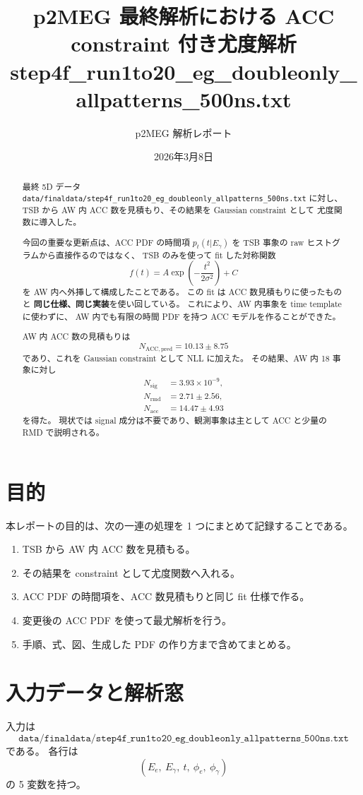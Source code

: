\documentclass[a4paper,11pt]{jsarticle}
\title{p2MEG 最終解析における ACC constraint 付き尤度解析\\
step4f\_run1to20\_eg\_doubleonly\_allpatterns\_500ns.txt}
\author{p2MEG 解析レポート}
\date{2026年3月8日}
\begin{document}
\maketitle

\begin{abstract}
最終 5D データ
\texttt{data/finaldata/step4f\_run1to20\_eg\_doubleonly\_allpatterns\_500ns.txt}
に対し、TSB から AW 内 ACC 数を見積もり、その結果を Gaussian constraint として
尤度関数に導入した。

今回の重要な更新点は、ACC PDF の時間項 \(p_t(t|E_\gamma)\) を
TSB 事象の raw ヒストグラムから直接作るのではなく、
TSB のみを使って fit した対称関数
\[
f(t)=A\exp\left(-\frac{t^2}{2\sigma^2}\right)+C
\]
を AW 内へ外挿して構成したことである。
この fit は ACC 数見積もりに使ったものと
\textbf{同じ仕様、同じ実装}を使い回している。
これにより、AW 内事象を time template に使わずに、
AW 内でも有限の時間 PDF を持つ ACC モデルを作ることができた。

AW 内 ACC 数の見積もりは
\[
N_{\mathrm{ACC,pred}} = 10.13 \pm 8.75
\]
であり、これを Gaussian constraint として NLL に加えた。
その結果、AW 内 18 事象に対し
\begin{align}
N_{\mathrm{sig}} &= 3.93\times 10^{-9},\\
N_{\mathrm{rmd}} &= 2.71 \pm 2.56,\\
N_{\mathrm{acc}} &= 14.47 \pm 4.93
\end{align}
を得た。
現状では signal 成分は不要であり、観測事象は主として ACC と少量の RMD で説明される。
\end{abstract}

\section{目的}
本レポートの目的は、次の一連の処理を 1 つにまとめて記録することである。
\begin{enumerate}
  \item TSB から AW 内 ACC 数を見積もる。
  \item その結果を constraint として尤度関数へ入れる。
  \item ACC PDF の時間項を、ACC 数見積もりと同じ fit 仕様で作る。
  \item 変更後の ACC PDF を使って最尤解析を行う。
  \item 手順、式、図、生成した PDF の作り方まで含めてまとめる。
\end{enumerate}

\section{入力データと解析窓}
入力は
\[
\texttt{data/finaldata/step4f\_run1to20\_eg\_doubleonly\_allpatterns\_500ns.txt}
\]
である。
各行は
\[
(E_e,\ E_\gamma,\ t,\ \phi_e,\ \phi_\gamma)
\]
の 5 変数を持つ。
\end{document}
